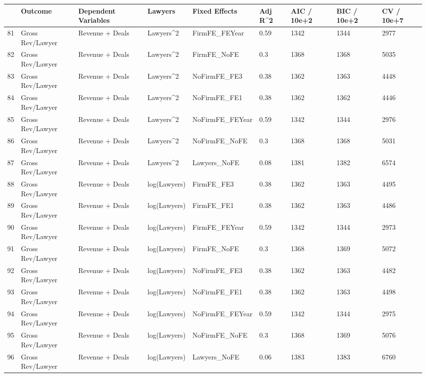 \documentclass{article}
\begin{document}
\begin{table}[H]
\centering
\begin{tabular}{rllllllll}
  \hline
 & Outcome & Dependent Variables & Lawyers & Fixed Effects & Adj R^2 & AIC / 10e+2 & BIC / 10e+2 & CV / 10e+7 \\ 
  \hline
81 & Gross Rev/Lawyer & Revenue + Deals & Lawyers^2 & FirmFE\_FEYear & 0.59 & 1342 & 1344 & 2977 \\ 
  82 & Gross Rev/Lawyer & Revenue + Deals & Lawyers^2 & FirmFE\_NoFE & 0.3 & 1368 & 1368 & 5035 \\ 
  83 & Gross Rev/Lawyer & Revenue + Deals & Lawyers^2 & NoFirmFE\_FE3 & 0.38 & 1362 & 1363 & 4448 \\ 
  84 & Gross Rev/Lawyer & Revenue + Deals & Lawyers^2 & NoFirmFE\_FE1 & 0.38 & 1362 & 1362 & 4446 \\ 
  85 & Gross Rev/Lawyer & Revenue + Deals & Lawyers^2 & NoFirmFE\_FEYear & 0.59 & 1342 & 1344 & 2976 \\ 
  86 & Gross Rev/Lawyer & Revenue + Deals & Lawyers^2 & NoFirmFE\_NoFE & 0.3 & 1368 & 1368 & 5031 \\ 
  87 & Gross Rev/Lawyer & Revenue + Deals & Lawyers^2 & Lawyers\_NoFE & 0.08 & 1381 & 1382 & 6574 \\ 
  88 & Gross Rev/Lawyer & Revenue + Deals & log(Lawyers) & FirmFE\_FE3 & 0.38 & 1362 & 1363 & 4495 \\ 
  89 & Gross Rev/Lawyer & Revenue + Deals & log(Lawyers) & FirmFE\_FE1 & 0.38 & 1362 & 1363 & 4486 \\ 
  90 & Gross Rev/Lawyer & Revenue + Deals & log(Lawyers) & FirmFE\_FEYear & 0.59 & 1342 & 1344 & 2973 \\ 
  91 & Gross Rev/Lawyer & Revenue + Deals & log(Lawyers) & FirmFE\_NoFE & 0.3 & 1368 & 1369 & 5072 \\ 
  92 & Gross Rev/Lawyer & Revenue + Deals & log(Lawyers) & NoFirmFE\_FE3 & 0.38 & 1362 & 1363 & 4482 \\ 
  93 & Gross Rev/Lawyer & Revenue + Deals & log(Lawyers) & NoFirmFE\_FE1 & 0.38 & 1362 & 1363 & 4498 \\ 
  94 & Gross Rev/Lawyer & Revenue + Deals & log(Lawyers) & NoFirmFE\_FEYear & 0.59 & 1342 & 1344 & 2975 \\ 
  95 & Gross Rev/Lawyer & Revenue + Deals & log(Lawyers) & NoFirmFE\_NoFE & 0.3 & 1368 & 1369 & 5076 \\ 
  96 & Gross Rev/Lawyer & Revenue + Deals & log(Lawyers) & Lawyers\_NoFE & 0.06 & 1383 & 1383 & 6760 \\ 

\end{tabular}
\end{table}
\end{document}
